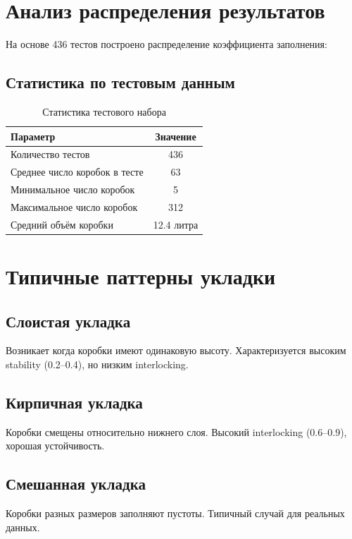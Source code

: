
\section{Анализ распределения результатов}

На основе 436 тестов построено распределение коэффициента заполнения:


\subsection{Статистика по тестовым данным}

\begin{table}[ht]
\centering
\caption{Статистика тестового набора}
\begin{tabular}{|l|c|}
\hline
\textbf{Параметр} & \textbf{Значение} \\
\hline
Количество тестов & 436 \\
Среднее число коробок в тесте & 63 \\
Минимальное число коробок & 5 \\
Максимальное число коробок & 312 \\
Средний объём коробки & 12.4 литра \\
\hline
\end{tabular}
\end{table}

\section{Типичные паттерны укладки}

\subsection{Слоистая укладка}
Возникает когда коробки имеют одинаковую высоту. Характеризуется высоким stability (0.2--0.4), но низким interlocking.


\subsection{Кирпичная укладка}
Коробки смещены относительно нижнего слоя. Высокий interlocking (0.6--0.9), хорошая устойчивость.


\subsection{Смешанная укладка}
Коробки разных размеров заполняют пустоты. Типичный случай для реальных данных.

